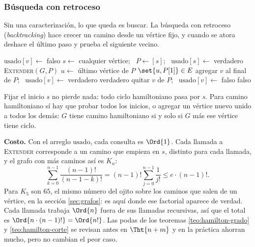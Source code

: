 \documentclass[11pt,letterpaper]{article}
\begin{document}

\subsubsection*{Búsqueda con retroceso}

Sin una caracterización, lo que queda es buscar. La búsqueda con
retroceso (\textit{backtracking}) hace crecer un camino desde un
vértice fijo, y cuando se atora deshace el último paso y prueba el
siguiente vecino.

\begin{algorithm}[H]
\caption{\textsc{Ciclo-Hamiltoniano}$(G)$: búsqueda con retroceso}
\label{alg:hamilton-retroceso}
\begin{algorithmic}[1]
    \State $\text{usado}[v] \gets$ falso
  \EndFor
  \State $s \gets$ cualquier vértice; \ $P \gets [s]$; \
         $\text{usado}[s] \gets$ verdadero
  \State \Return \textsc{Extender}$(G, P)$
\EndProcedure
\Statex
{}
  \State $u \gets$ último vértice de $P$
    \State \Return $\set{u, P[1]} \in E$ 
  \EndIf
    \State agregar $v$ al final de $P$; \
           $\text{usado}[v] \gets$ verdadero
    \If{\textsc{Extender}$(G, P)$}
      \State \Return verdadero
    \EndIf
    \State quitar $v$ de $P$; \ $\text{usado}[v] \gets$ falso
  \EndFor
  \State \Return falso
\EndProcedure
\end{algorithmic}
\end{algorithm}

Fijar el inicio $s$ no pierde nada: todo ciclo hamiltoniano pasa por
$s$. Para camino hamiltoniano sí hay que probar todos los inicios, o
agregar un vértice nuevo unido a todos los demás: $G$ tiene camino
hamiltoniano si y solo si $G$ más ese vértice tiene ciclo.

\textbf{Costo.} Con el arreglo $\text{usado}$, cada consulta es
$\Ord{1}$. Cada llamada a \textsc{Extender} corresponde a un camino
que empieza en $s$, distinto para cada llamada, y el grafo con más
caminos así es $K_n$:
\[
  \sum_{k=0}^{n-1} \frac{(n-1)!}{(n-1-k)!}
  = (n-1)! \sum_{j=0}^{n-1} \frac{1}{j!} \le e \cdot (n-1)! .
\]
Para $K_5$ son $65$, el mismo número del ojito sobre los caminos que
salen de un vértice, en la sección \ref{sec:grafos}: es aquí donde ese
factorial aparece de verdad. Cada llamada trabaja $\Ord{n}$ fuera de
sus llamadas recursivas, así que el total es
$\Ord{n \cdot (n-1)!} = \Ord{n!}$. Las podas de los teoremas
\ref{teo:hamilton-grado} y
\ref{teo:hamilton-corte} se revisan antes en $\Tht{n + m}$ y en la
práctica ahorran mucho, pero no cambian el peor caso.
\end{document}
